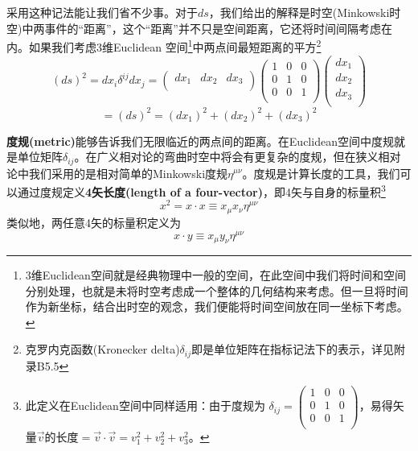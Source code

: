 采用这种记法能让我们省不少事。对于$ds$，我们给出的解释是时空(Minkowski时空)中两事件的“距离”，这个“距离”并不只是空间距离，它还将时间间隔考虑在内。如果我们考虑3维Euclidean 空间\footnote{3维Euclidean空间就是经典物理中一般的空间，在此空间中我们将时间和空间分别处理，也就是未将时空考虑成一个整体的几何结构来考虑。但一旦将时间作为新坐标，结合出时空的观念，我们便能将时间空间放在同一坐标下考虑。}中两点间最短距离的平方\footnote{克罗内克函数(Kronecker delta)$\delta_{ij}$即是单位矩阵在指标记法下的表示，详见附录B5.5}
\[
  (ds)^2=dx_i \delta^{ij} dx_j
  =\left(
     \begin{array}{ccc}
     dx_1 & dx_2 & dx_3 \\
     \end{array}
   \right)
   \left(
     \begin{array}{ccc}
       1 & 0 & 0  \\
       0 & 1 & 0  \\
        0 & 0 & 1  \\
     \end{array}
   \right)
   \left(
     \begin{array}{c}
        dx_1 \\
       dx_2 \\
        dx_3\\
     \end{array}
   \right)
   \]
\begin{equation}\label{eq2.27}
  =(ds)^2=(dx_1)^2+(dx_2)^2+(dx_3)^2
\end{equation}

{\bf{度规(metric)}}能够告诉我们无限临近的两点间的距离。在Euclidean空间中度规就是单位矩阵$\delta_{ij}$。在广义相对论的弯曲时空中将会有更复杂的度规，但在狭义相对论中我们采用的是相对简单的Minkowski度规$\eta^{\mu\nu}$。度规是计算长度的工具，我们可以通过度规定义{\bf{4矢长度(length of a four-vector)}}，即4矢与自身的标量积\footnote{此定义在Euclidean空间中同样适用：由于度规为
$\delta_{ij}=\left(
 \begin{array}{ccc}
 1 & 0 & 0  \\
  0 & 1 & 0  \\
  0 & 0 & 1  \\
  \end{array}
  \right)
$，易得矢量$\vec{v}$的长度$=\vec{v}\cdot\vec{v}=v_1^2+v_2^2+v_3^2$。}
\[
x^2=x \cdot x \equiv x_\mu x_\nu \eta^{\mu\nu}
\]
类似地，两任意4矢的标量积定义为
\begin{equation}\label{eq2.28}
  x\cdot y\equiv x_\mu y_\nu \eta^{\mu\nu}
\end{equation}


